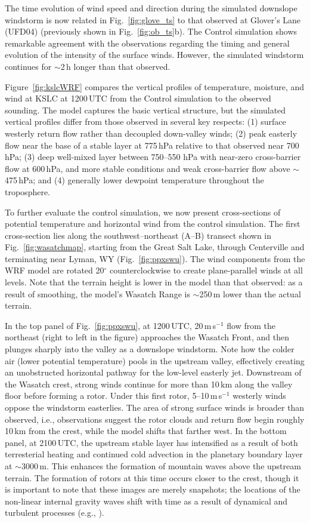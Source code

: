 \documentclass[pdftex,12pt]{article}
\def\mps{m\,s$^{-1}$}
\def\degarc{$^{\circ}$} %
\def\around{$\sim$}
\begin{document}
The time evolution of wind speed and direction during the simulated downslope windstorm is now related in Fig.~\ref{fig:glove_ts} to that observed at Glover's Lane (UFD04)  (previously shown in Fig.~\ref{fig:ob_ts}b). The Control simulation shows remarkable agreement with the observations regarding the timing and general evolution of the intensity of the surface winds. However, the simulated windstorm continues for \around 2\,h longer than that observed.

Figure~\ref{fig:kslcWRF} compares the vertical profiles of temperature, moisture, and wind at KSLC at 1200\,UTC from the Control simulation to the observed sounding. The model captures the basic vertical structure, but the simulated vertical profiles differ from those observed in several key respects: (1) surface westerly return flow rather than decoupled down-valley winds; (2) peak easterly flow near the base of a stable layer at 775\,hPa relative to that observed near 700\,hPa; (3) deep well-mixed layer between 750--550 hPa with near-zero cross-barrier flow at 600\,hPa, and more stable conditions and weak cross-barrier flow above \around 475\,hPa; and (4) generally lower dewpoint temperature throughout the troposphere.

To further evaluate the control simulation, we now present cross-sections of potential temperature and horizontal wind from the control simulation. The first cross-section lies along the southwest--northeast (A--B) transect shown in Fig.~\ref{fig:wasatchmap}, starting from the Great Salt Lake, through Centerville and terminating near Lyman, WY (Fig.~\ref{fig:ppxswu}). The wind components from the WRF model are rotated 20\degarc{} counterclockwise to create plane-parallel winds at all levels. Note that the terrain height is lower in the model than that observed: as a result of smoothing, the model's Wasatch Range is \around 250\,m lower than the actual terrain.

In the top panel of Fig.~\ref{fig:ppxswu}, at 1200\,UTC, 20\,\mps{} flow from the northeast (right to left in the figure) approaches the Wasatch Front, and then plunges sharply into the valley as a downslope windstorm. Note how the colder air (lower potential temperature) pools in the upstream valley, effectively creating an unobstructed horizontal pathway for the low-level easterly jet. Downstream of the Wasatch crest, strong winds continue for more than 10\,km along the valley floor before forming a rotor. Under this first rotor, \mbox{5--10\,\mps{}} westerly winds oppose the windstorm easterlies. The area of strong surface winds is broader than observed, i.e., observations suggest the rotor clouds and return flow begin roughly 10\,km from the crest, while the model shifts that farther west. In the bottom panel, at 2100\,UTC, the upstream stable layer has intensified as a result of both terresterial heating and continued cold advection in the planetary boundary layer at \around 3000\,m. This enhances the formation of mountain waves above the upstream terrain. The formation of rotors at this time occurs closer to the crest, though it is important to note that these images are merely snapshots; the locations of the non-linear internal gravity waves shift with time as a result of dynamical and turbulent processes (e.g., \citealt{Hertenstein2009}).
\end{document}
